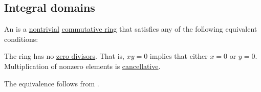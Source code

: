 \subsection{Integral domains}\label{subsec:integral_domains}

\begin{definition}\label{def:integral_domain}
  An  is a \hyperref[def:ring/trivial]{nontrivial} \hyperref[def:ring/commutative]{commutative ring} that satisfies any of the following equivalent conditions:
  \begin{thmenum}
     The ring has no \hyperref[def:divisibility]{zero divisors}. That is, \( xy = 0 \) implies that either \( x = 0 \) or \( y = 0 \).
     Multiplication of nonzero elements is \hyperref[def:magma/cancellative]{cancellative}.
  \end{thmenum}
\end{definition}
\begin{defproof}
  The equivalence follows from .
\end{defproof}
